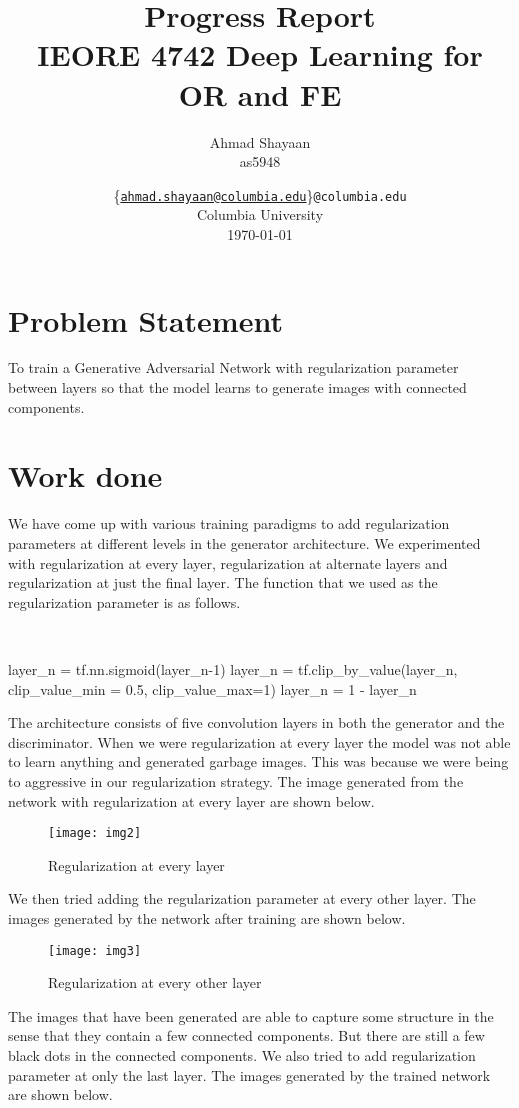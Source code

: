 \documentclass[12pt]{article}
\title{\Large{\textbf{Progress Report}}\\\Large{IEORE 4742 Deep Learning for OR and FE}}
\author{
    Ahmad Shayaan \\as5948
    }
\date{
\{\href{mailto:ahmad.shayaan@columbia.edu}{\texttt{\small{ahmad.shayaan@columbia.edu}}}\}\texttt{\small{@columbia.edu}}\\
    Columbia University\\
    \today}
\begin{document}
\maketitle

\pagebreak

\section*{Problem Statement}
To train a Generative Adversarial Network with regularization parameter between layers so that the model learns to generate images with connected components.

\section*{Work done}

We have come up with various training paradigms to add regularization parameters at different levels in the generator architecture. We experimented with regularization at every layer, regularization at alternate layers and regularization at just the final layer. The function that we used as the regularization parameter is as follows.

\

\begin{python}
layer_n = tf.nn.sigmoid(layer_n-1)
layer_n = tf.clip_by_value(layer_n, clip_value_min = 0.5, clip_value_max=1)
layer_n = 1 - layer_n
\end{python}

\noindent The architecture consists of five convolution layers in both the generator and the discriminator. When we were regularization at every layer the model was not able to learn anything and generated garbage images. This was because we were being to aggressive in our regularization strategy. The image generated from the network with regularization at every layer are shown below.

\begin{figure}[H]
	\centering
	\texttt{[image: img2]}
	\caption{Regularization at every layer}
\end{figure}

We then tried adding the regularization parameter at every other layer. The images generated by the network after training are shown below.

\begin{figure}[H]
	\centering
	\texttt{[image: img3]}
	\caption{Regularization at every other layer}
\end{figure}
The images that have been generated are able to capture some structure in the sense that they contain a few connected components. But there are still a few black dots in the connected components. We also tried to add regularization parameter at only the last layer. The images generated by the trained network are shown below.
\end{document}
